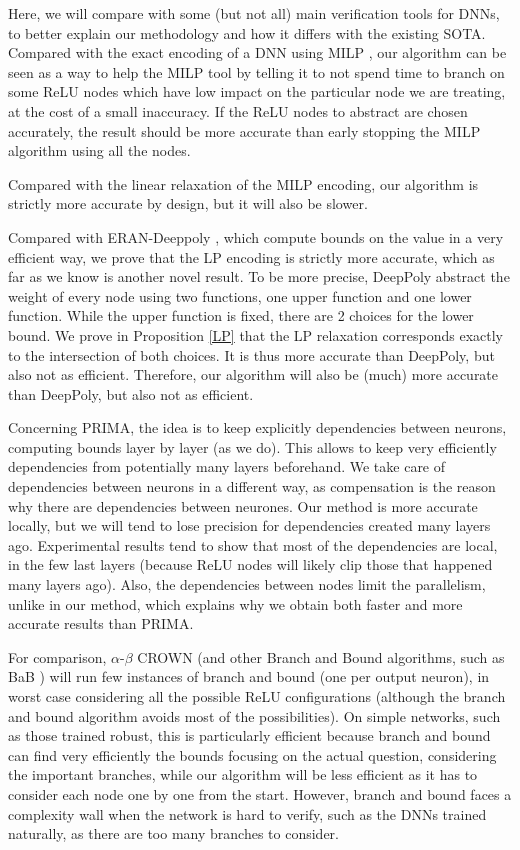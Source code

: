 \smallskip

 Here, we will compare with some (but not all) main verification tools for DNNs, to better explain our methodology and how it differs with the existing SOTA.
Compared with the exact encoding of a DNN using MILP \cite{MILP}, our algorithm can be seen as a way to help the MILP tool by telling it to not spend time to branch on some ReLU nodes which have low impact on the particular node we are treating, at the cost of a small inaccuracy. If the ReLU nodes to abstract are chosen accurately, the result should be more accurate than early stopping the MILP algorithm using all the nodes.

Compared with the linear relaxation of the MILP encoding, our algorithm is strictly more accurate by design, but it will also be slower.

Compared with ERAN-Deeppoly \cite{deeppoly}, which compute bounds on the value in a very efficient way, we prove that the LP encoding is strictly more accurate, which as far as we know is another novel result. To be more precise, DeepPoly
abstract the weight of every node using two functions, one upper function and one lower function. While the upper function is fixed, there are 2 choices for the lower bound.
We prove in Proposition  \ref{LP} that the LP relaxation corresponds exactly to the intersection of both choices. It is thus more accurate than DeepPoly, but also not as efficient. Therefore, our algorithm will also be (much) more accurate than DeepPoly, but also not as efficient.

Concerning PRIMA, the idea is to keep explicitly dependencies between neurons, computing bounds layer by layer (as we do). This allows to keep very efficiently dependencies from potentially many layers beforehand. We take care of dependencies between neurons in a different way, as compensation is the reason why there are dependencies between neurones. 
Our method is more accurate locally, but we will tend to lose precision for dependencies created many layers ago. Experimental results tend to show that most of the dependencies are local, in the few last layers (because ReLU nodes will likely clip those that happened many layers ago). Also, the dependencies between nodes limit the parallelism, unlike in our method, which explains why we obtain both faster and more accurate results than PRIMA.

For comparison, $\alpha$-$\beta$ CROWN \cite{crown} (and other Branch and Bound algorithms, such as BaB \cite{BaB}) will run few instances of branch and bound (one per output neuron), in worst case considering all the possible ReLU configurations (although the branch and bound algorithm avoids most of the possibilities). On simple networks, such as those trained robust, this is particularly efficient because branch and bound can find very efficiently the bounds focusing on the actual question, considering the important branches, while our algorithm will be less efficient as it has to consider each node one by one from the start. However, branch and bound faces a complexity wall when the network is hard to verify, such as the DNNs trained naturally, as there are too many branches to consider.

